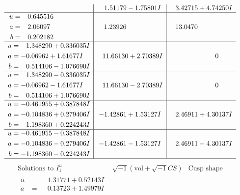 \documentclass[1p]{elsarticle_modified}
\theoremstyle{definition}
\newcommand{\I}{\sqrt{-1}}
\begin{document}
$$\begin{array}{c|c|c}
 & \phantom{-}1.51179 - 1.75801 I & \phantom{-}3.42715 + 4.74250 I \\ \hline\begin{aligned}
u &= \phantom{-}0.645516\phantom{ +0.000000I} \\
a &= \phantom{-}2.06097\phantom{ +0.000000I} \\
b &= \phantom{-}0.202182\phantom{ +0.000000I}\end{aligned}
 & \phantom{-}1.23926\phantom{ +0.000000I} & \phantom{-}13.0470\phantom{ +0.000000I} \\ \hline\begin{aligned}
u &= \phantom{-}1.348290 + 0.336035 I \\
a &= -0.06962 + 1.61677 I \\
b &= \phantom{-}0.514106 - 1.076690 I\end{aligned}
 & \phantom{-}11.66130 + 2.70389 I & \phantom{-0.000000 } 0 \\ \hline\begin{aligned}
u &= \phantom{-}1.348290 - 0.336035 I \\
a &= -0.06962 - 1.61677 I \\
b &= \phantom{-}0.514106 + 1.076690 I\end{aligned}
 & \phantom{-}11.66130 - 2.70389 I & \phantom{-0.000000 } 0 \\ \hline\begin{aligned}
u &= -0.461955 + 0.387848 I \\
a &= -0.104836 + 0.279406 I \\
b &= -1.198360 + 0.224243 I\end{aligned}
 & -1.42861 + 1.53127 I & \phantom{-}2.46911 + 4.30137 I \\ \hline\begin{aligned}
u &= -0.461955 - 0.387848 I \\
a &= -0.104836 - 0.279406 I \\
b &= -1.198360 - 0.224243 I\end{aligned}
 & -1.42861 - 1.53127 I & \phantom{-}2.46911 - 4.30137 I\\
 \hline 
 \end{array}$$\newpage$$\begin{array}{c|c|c}  
\text{Solutions to }I^u_{1}& \I (\text{vol} + \sqrt{-1}CS) & \text{Cusp shape}\\
 \hline 
\begin{aligned}
u &= \phantom{-}1.31771 + 0.52143 I \\
a &= \phantom{-}0.13723 + 1.49979 I \\

\end{aligned}
\end{array}$$
\end{document}
